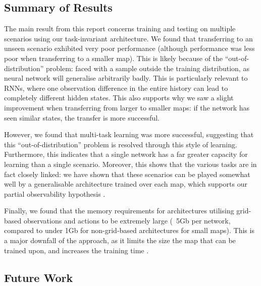 \subsection{Summary of Results}

The main result from this report concerns training and testing on multiple scenarios using our task-invariant architecture. We found that transferring to an unseen scenario exhibited very poor performance (although performance was less poor when transferring to a smaller map). This is likely because of the ``out-of-distribution'' \cite{ood} problem: faced with a sample outside the training distribution, as neural network will generalise arbitrarily badly. This is particularly relevant to RNNs, where one observation difference in the entire history can lead to completely different hidden states. This also supports why we saw a slight improvement when transferring from larger to smaller maps: if the network has seen similar states, the transfer is more successful.



However, we found that multi-task learning was more successful, suggesting that this ``out-of-distribution'' problem is resolved through this style of learning. Furthermore, this indicates that a single network has a far greater capacity for learning than a single scenario. Moreover, this shows that the various tasks are in fact closely linked: we have shown that these scenarios can be played somewhat well by a generalisable architecture trained over each map, which supports our partial observability hypothesis .



Finally, we found that the memory requirements for architectures utilising grid-based observations and actions to be extremely large (~5Gb per network, compared to under 1Gb for non-grid-based architectures for small maps). This is a major downfall of the approach, as it limits the size the map that can be trained upon, and increases the training time .





\subsection{Future Work}

